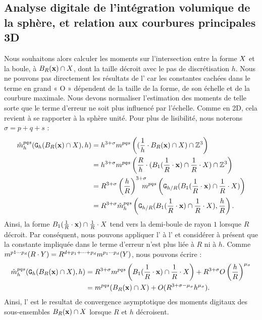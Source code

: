 \subsection{Analyse digitale de l'intégration volumique de la sphère, et
relation aux courbures principales 3D}
%
Nous souhaitons alors calculer les moments sur l'intersection entre la forme
$X$ et la boule, \cad à $B_{R}(\mathbf{x}) \cap X$, dont la taille décroit
avec le pas de discrétisation $h$. Nous ne pouvons pas directement les résultats
de l' car les constantes cachées dans le
terme en grand « O » dépendent de la taille de la forme, de son échelle et de la
courbure maximale. Nous devons normaliser l'estimation des moments de telle sorte
que le terme d'erreur ne soit plus influencé par l'échelle. Comme en 2D, cela
revient à se rapporter à la sphère unité. Pour plus de lisibilité, nous noterons
$\sigma = p + q + s$ :
%
\begin{align} \label{eq:MomentsOnUnitaryBall}
%
  \DMom{pqs}{h}(\DigF{\Ball{R}{\vx} \cap \Shape}{h},h) &= h^{3+\sigma}\Mom{pqs}\left
  ( (\frac{1}{h} \cdot \Ball{R}{\vx} \cap \Shape) \cap \Z^3 \right) \nonumber \\
  &= h^{3+{\sigma}} \Mom{pqs}\left( \frac{R}{h}\cdot(
  \Ball{1}{\frac{1}{R} \cdot \vx} \cap \frac{1}{R} \cdot \Shape) \cap \Z^3 \right) \nonumber \\
  &= R^{3+{\sigma}} \left( \frac{h}{R} \right)^{3+{\sigma}} \hspace{-0.3cm} \Mom{pqs} \left( \DigF{ \Ball{1}{\frac{1}{R}\cdot \vx}\cap\frac{1}{R}\cdot \Shape}{h/R} \right) \nonumber\\
  &= R^{3+{\sigma}}\DMom{pqs}{h}\left( \DigF{ \Ball{1}{\frac{1}{R}\cdot \vx}\cap\frac{1}{R}\cdot \Shape}{h/R}, {\frac{h}{R}} \right).
%
\end{align}
%
Ainsi, la forme $B_{1}(\frac{1}{R} \cdot \mathbf{x})\cap\frac{1}{R}\cdot X$
tend vers la demi-boule de rayon $1$ lorsque $R$ décroit. Par conséquent, nous
pouvons appliquer l' à
l' et considérer à présent que la constante
impliquée dans le terme d'erreur n'est plus liée à $R$ ni à $h$. Comme $m^{p1
\cdots p_d}(R \cdot Y) = R^{d+p_1+\cdots+p_d} m^{p_1 \cdots p_d}(Y)$, nous
pouvons écrire :
%
\begin{align} \label{eq:MomentsOnUnitaryBall-conv}
%
  \DMom{pqs}{h}(\DigF{\Ball{R}{\vx} \cap \Shape}{h},h) &= R^{3+\sigma}
  \Mom{pqs}\left( \Ball{1}{\frac{1}{R}\cdot \vx} \cap \frac{1}{R}\cdot \Shape
  \right) + R^{3+\sigma} O \left( \frac{h}{R} \right)^{\mu_{{\sigma}}}  \nonumber \\
   &= \Mom{pqs}( \Ball{R}{\vx} \cap \Shape ) + O( R^{3+{\sigma}-\mu_\sigma} h^{\mu_\sigma}).
%
\end{align}
%
Ainsi, l' est le resultat de
convergence asymptotique des moments digitaux des sous-ensembles $B_{R}(\mathbf{x})
\cap X$ lorsque $R$ et $h$ décroisent.
%
